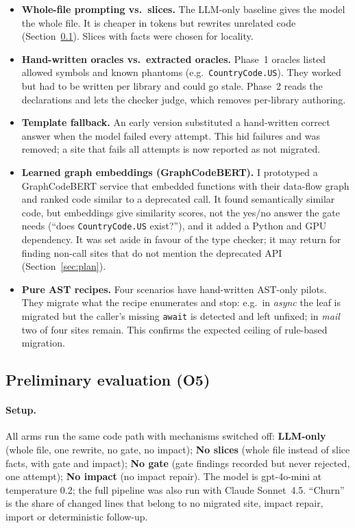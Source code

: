 \documentclass[11pt,a4paper]{article}
\newcommand{\code}[1]{\texttt{#1}}
\begin{document}
\begin{itemize}
  \item \textbf{Whole-file prompting vs.\ slices.} The LLM-only baseline gives the model the
        whole file. It is cheaper in tokens but rewrites unrelated code (Section~\ref{sec:eval}).
        Slices with facts were chosen for locality.
  \item \textbf{Hand-written oracles vs.\ extracted oracles.} Phase~1 oracles listed allowed
        symbols and known phantoms (e.g.\ \code{CountryCode.US}). They worked but had to be
        written per library and could go stale. Phase~2 reads the declarations and lets the
        checker judge, which removes per-library authoring.
  \item \textbf{Template fallback.} An early version substituted a hand-written correct answer
        when the model failed every attempt. This hid failures and was removed; a site that
        fails all attempts is now reported as not migrated.
  \item \textbf{Learned graph embeddings (GraphCodeBERT).} I prototyped a GraphCodeBERT
        \citep{guo2021graphcodebert} service that embedded functions with their data-flow graph
        and ranked code similar to a deprecated call. It found semantically similar code, but
        embeddings give similarity scores, not the yes/no answer the gate needs (``does
        \code{CountryCode.US} exist?''), and it added a Python and GPU dependency. It was set
        aside in favour of the type checker; it may return for finding non-call sites that do
        not mention the deprecated API (Section~\ref{sec:plan}).
  \item \textbf{Pure AST recipes.} Four scenarios have hand-written AST-only pilots. They
        migrate what the recipe enumerates and stop: e.g.\ in \emph{async} the leaf is migrated
        but the caller's missing \code{await} is detected and left unfixed; in \emph{mail} two
        of four sites remain. This confirms the expected ceiling of rule-based migration.
\end{itemize}

\subsection{Preliminary evaluation (O5)}
\label{sec:eval}

\paragraph{Setup.}
All arms run the same code path with mechanisms switched off: \textbf{LLM-only} (whole file,
one rewrite, no gate, no impact); \textbf{No slices} (whole file instead of slice facts, with
gate and impact); \textbf{No gate} (gate findings recorded but never rejected, one attempt);
\textbf{No impact} (no impact repair). The model is gpt-4o-mini at temperature 0.2; the full
pipeline was also run with Claude Sonnet~4.5. ``Churn'' is the share of changed lines that
belong to no migrated site, impact repair, import or deterministic follow-up.
\end{document}
